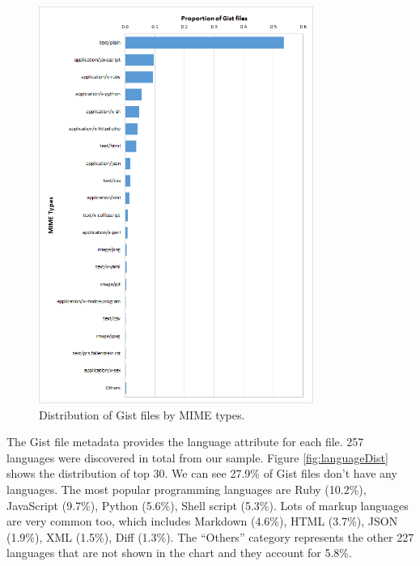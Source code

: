 \begin{figure}[!htbp]
	\centering
	\includegraphics[width=0.8\textwidth]{figures/typeDistribution.png}
	\caption{Distribution of Gist files by MIME types.}
	\label{fig:typeDist}
\end{figure}

The Gist file metadata provides the language attribute for each file. 257 languages were discovered in total from our sample. Figure \ref{fig:languageDist} shows the distribution of top 30. We can see 27.9\% of Gist files don't have any languages. The most popular programming languages are Ruby (10.2\%), JavaScript (9.7\%), Python (5.6\%), Shell script (5.3\%). Lots of markup languages are very common too, which includes Markdown (4.6\%), HTML (3.7\%), JSON (1.9\%), XML (1.5\%), Diff (1.3\%). The ``Others'' category represents the other 227 languages that are not shown in the chart and they account for 5.8\%. 


